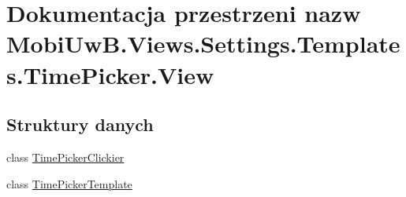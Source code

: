 \hypertarget{a00292}{}\section{Dokumentacja przestrzeni nazw Mobi\+Uw\+B.\+Views.\+Settings.\+Templates.\+Time\+Picker.\+View}
\label{a00292}
\subsection*{Struktury danych}
\begin{DoxyCompactItemize}
\item 
class \hyperlink{a00072}{Time\+Picker\+Clickier}
\item 
class \hyperlink{a00073}{Time\+Picker\+Template}
\end{DoxyCompactItemize}
